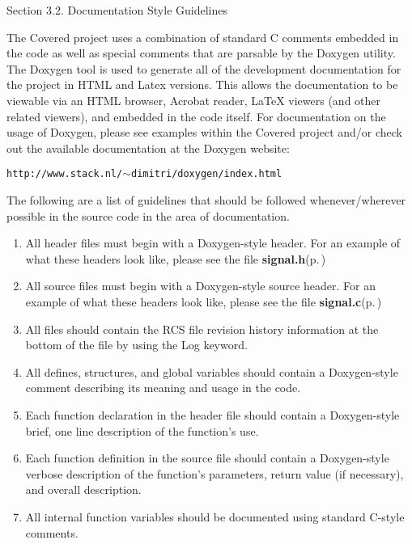 \begin{Desc}
\item[Section 3.2. Documentation Style Guidelines]\end{Desc}
\begin{Desc}
\item[]The Covered project uses a combination of standard C comments embedded in the code as well as special comments that are parsable by the Doxygen utility. The Doxygen tool is used to generate all of the development documentation for the project in HTML and Latex versions. This allows the documentation to be viewable via an HTML browser, Acrobat reader, La\-Te\-X viewers (and other related viewers), and embedded in the code itself. For documentation on the usage of Doxygen, please see examples within the Covered project and/or check out the available documentation at the Doxygen website:\end{Desc}
\begin{Desc}
\item[]{\tt http://www.stack.nl/$\sim$dimitri/doxygen/index.html}\end{Desc}
\begin{Desc}
\item[]The following are a list of guidelines that should be followed whenever/wherever possible in the source code in the area of documentation.\end{Desc}
\begin{Desc}
\item[]\begin{enumerate}
\item All header files must begin with a Doxygen-style header. For an example of what these headers look like, please see the file {\bf signal.h}{\rm (p.\,\pageref{signal_8h})} \item All source files must begin with a Doxygen-style source header. For an example of what these headers look like, please see the file {\bf signal.c}{\rm (p.\,\pageref{signal_8c})} \item All files should contain the RCS file revision history information at the bottom of the file by using the Log keyword. \item All defines, structures, and global variables should contain a Doxygen-style comment describing its meaning and usage in the code. \item Each function declaration in the header file should contain a Doxygen-style brief, one line description of the function's use. \item Each function definition in the source file should contain a Doxygen-style verbose description of the function's parameters, return value (if necessary), and overall description. \item All internal function variables should be documented using standard C-style comments. \end{enumerate}
\end{Desc}
